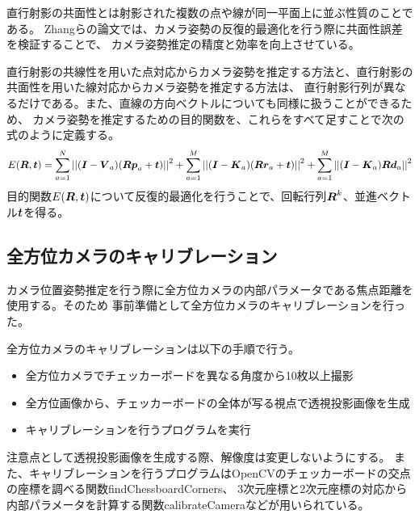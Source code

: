\documentclass[]{jarticle}          %
\begin{document}
直行射影の共面性とは射影された複数の点や線が同一平面上に並ぶ性質のことである。
Zhangらの論文では、カメラ姿勢の反復的最適化を行う際に共面性誤差を検証することで、
カメラ姿勢推定の精度と効率を向上させている。

直行射影の共線性を用いた点対応からカメラ姿勢を推定する方法と、直行射影の共面性を用いた線対応からカメラ姿勢を推定する方法は、
直行射影行列が異なるだけである。また、直線の方向ベクトルについても同様に扱うことができるため、
カメラ姿勢を推定するための目的関数を、これらをすべて足すことで次の式のように定義する。
\begin{equation}
  E(\mbox{\boldmath $R$},\mbox{\boldmath $t$})=\sum^N_{a=1}{||(\mbox{\boldmath $I$}-\mbox{\boldmath $V$}_a)(\mbox{\boldmath $R$}\mbox{\boldmath $p$}_a+\mbox{\boldmath $t$})||}^2+\sum^M_{a=1}{||(\mbox{\boldmath $I$}-\mbox{\boldmath $K$}_a)(\mbox{\boldmath $R$}\mbox{\boldmath $r$}_a+\mbox{\boldmath $t$})||}^2+\sum^M_{a=1}{||(\mbox{\boldmath $I$}-\mbox{\boldmath $K$}_a)\mbox{\boldmath $R$}\mbox{\boldmath $d$}_a||}^2
\end{equation}
目的関数$E(\mbox{\boldmath $R$},\mbox{\boldmath $t$})$について反復的最適化を行うことで、回転行列$\mbox{\boldmath $R$}^k$、並進ベクトル$\mbox{\boldmath $t$}$を得る。

\subsection{全方位カメラのキャリブレーション}
カメラ位置姿勢推定を行う際に全方位カメラの内部パラメータである焦点距離を使用する。そのため
事前準備として全方位カメラのキャリブレーションを行った。

全方位カメラのキャリブレーションは以下の手順で行う。
\begin{itemize}
  \item 全方位カメラでチェッカーボードを異なる角度から10枚以上撮影
  \item 全方位画像から、チェッカーボードの全体が写る視点で透視投影画像を生成
  \item キャリブレーションを行うプログラムを実行
\end{itemize}
注意点として透視投影画像を生成する際、解像度は変更しないようにする。
また、キャリブレーションを行うプログラムはOpenCVのチェッカーボードの交点の座標を調べる関数findChessboardCorners、
3次元座標と2次元座標の対応から内部パラメータを計算する関数calibrateCameraなどが用いられている。
\end{document}
